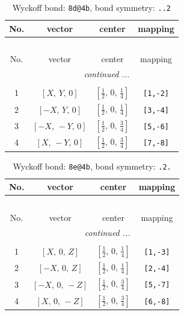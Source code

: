 \documentclass[fleqn,8pt]{jsarticle}
\begin{document}
\begin{longtable}{cccc}
\caption{Wyckoff bond: {\tt 8d@4b}, bond symmetry: {\tt ..2}}
 \\
 \hline \hline
No. & vector & center & mapping \\ \hline \endfirsthead

\multicolumn{3}{l}{\tablename\ \thetable{}} \\
 \hline \hline
No. & vector & center & mapping \\ \hline \endhead

 \hline \hline
\multicolumn{3}{r}{\footnotesize\it continued ...} \\ \endfoot

 \hline \hline
\multicolumn{3}{r}{} \\ \endlastfoot

1 & $\left[ X,\, Y,\, 0 \right]$ & $\left[ \frac{1}{2},\, 0,\, \frac{1}{4} \right]$ & {\tt [1,-2]} \\ \hline
2 & $\left[ - X,\, Y,\, 0 \right]$ & $\left[ \frac{1}{2},\, 0,\, \frac{1}{4} \right]$ & {\tt [3,-4]} \\ \hline
3 & $\left[ - X,\, - Y,\, 0 \right]$ & $\left[ \frac{1}{2},\, 0,\, \frac{3}{4} \right]$ & {\tt [5,-6]} \\ \hline
4 & $\left[ X,\, - Y,\, 0 \right]$ & $\left[ \frac{1}{2},\, 0,\, \frac{3}{4} \right]$ & {\tt [7,-8]} \\
\end{longtable}
\renewcommand{\arraystretch}{1.2}
\begin{longtable}{cccc}
\caption{Wyckoff bond: {\tt 8e@4b}, bond symmetry: {\tt .2.}}
 \\
 \hline \hline
No. & vector & center & mapping \\ \hline \endfirsthead

\multicolumn{3}{l}{\tablename\ \thetable{}} \\
 \hline \hline
No. & vector & center & mapping \\ \hline \endhead

 \hline \hline
\multicolumn{3}{r}{\footnotesize\it continued ...} \\ \endfoot

 \hline \hline
\multicolumn{3}{r}{} \\ \endlastfoot

1 & $\left[ X,\, 0,\, Z \right]$ & $\left[ \frac{1}{2},\, 0,\, \frac{1}{4} \right]$ & {\tt [1,-3]} \\ \hline
2 & $\left[ - X,\, 0,\, Z \right]$ & $\left[ \frac{1}{2},\, 0,\, \frac{1}{4} \right]$ & {\tt [2,-4]} \\ \hline
3 & $\left[ - X,\, 0,\, - Z \right]$ & $\left[ \frac{1}{2},\, 0,\, \frac{3}{4} \right]$ & {\tt [5,-7]} \\ \hline
4 & $\left[ X,\, 0,\, - Z \right]$ & $\left[ \frac{1}{2},\, 0,\, \frac{3}{4} \right]$ & {\tt [6,-8]} \\
\end{longtable}
\end{document}
